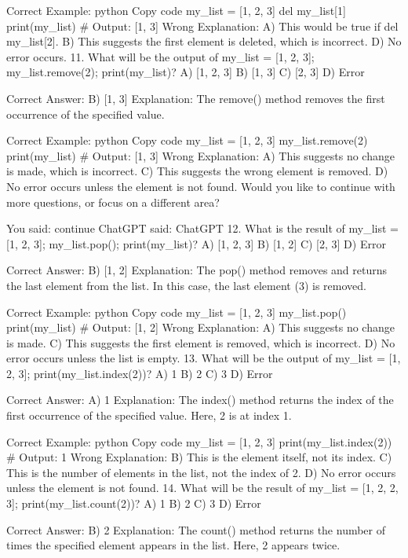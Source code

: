 Correct Example:
python
Copy code
my_list = [1, 2, 3]
del my_list[1]
print(my_list)  # Output: [1, 3]
Wrong Explanation:
A) This would be true if del my_list[2].
B) This suggests the first element is deleted, which is incorrect.
D) No error occurs.
11. What will be the output of my_list = [1, 2, 3]; my_list.remove(2); print(my_list)?
A) [1, 2, 3]
B) [1, 3]
C) [2, 3]
D) Error

Correct Answer: B) [1, 3]
Explanation: The remove() method removes the first occurrence of the specified value.

Correct Example:
python
Copy code
my_list = [1, 2, 3]
my_list.remove(2)
print(my_list)  # Output: [1, 3]
Wrong Explanation:
A) This suggests no change is made, which is incorrect.
C) This suggests the wrong element is removed.
D) No error occurs unless the element is not found.
Would you like to continue with more questions, or focus on a different area?






You said:
continue
ChatGPT said:
ChatGPT
12. What is the result of my_list = [1, 2, 3]; my_list.pop(); print(my_list)?
A) [1, 2, 3]
B) [1, 2]
C) [2, 3]
D) Error

Correct Answer: B) [1, 2]
Explanation: The pop() method removes and returns the last element from the list. In this case, the last element (3) is removed.

Correct Example:
python
Copy code
my_list = [1, 2, 3]
my_list.pop()
print(my_list)  # Output: [1, 2]
Wrong Explanation:
A) This suggests no change is made.
C) This suggests the first element is removed, which is incorrect.
D) No error occurs unless the list is empty.
13. What will be the output of my_list = [1, 2, 3]; print(my_list.index(2))?
A) 1
B) 2
C) 3
D) Error

Correct Answer: A) 1
Explanation: The index() method returns the index of the first occurrence of the specified value. Here, 2 is at index 1.

Correct Example:
python
Copy code
my_list = [1, 2, 3]
print(my_list.index(2))  # Output: 1
Wrong Explanation:
B) This is the element itself, not its index.
C) This is the number of elements in the list, not the index of 2.
D) No error occurs unless the element is not found.
14. What will be the result of my_list = [1, 2, 2, 3]; print(my_list.count(2))?
A) 1
B) 2
C) 3
D) Error

Correct Answer: B) 2
Explanation: The count() method returns the number of times the specified element appears in the list. Here, 2 appears twice.

